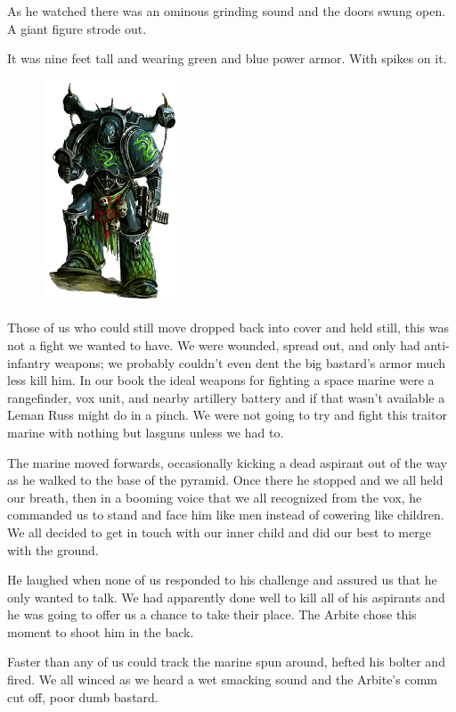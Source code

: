 As he watched there was an ominous grinding sound and the doors swung open. 
A giant figure strode out. 

It was nine feet tall and wearing green and blue power armor. 
With spikes on it.

\begin{figure}
	\begin{center}
		\includegraphics[width=\figwidth]{pics/6/46.png}
	\end{center}
\end{figure}
Those of us who could still move dropped back into cover and held still, this was not a fight we wanted to have. 
We were wounded, spread out, and only had anti-infantry weapons; we probably couldn't even dent the big bastard's armor much less kill him. 
In our book the ideal weapons for fighting a space marine were a rangefinder, vox unit, and nearby artillery battery and if that wasn't available a Leman Russ might do in a pinch. 
We were not going to try and fight this traitor marine with nothing but lasguns unless we had to.

The marine moved forwards, occasionally kicking a dead aspirant out of the way as he walked to the base of the pyramid. 
Once there he stopped and we all held our breath, then in a booming voice that we all recognized from the vox, he commanded us to stand and face him like men instead of cowering like children. 
We all decided to get in touch with our inner child and did our best to merge with the ground. 

He laughed when none of us responded to his challenge and assured us that he only wanted to talk. 
We had apparently done well to kill all of his aspirants and he was going to offer us a chance to take their place. 
The Arbite chose this moment to shoot him in the back.

Faster than any of us could track the marine spun around, hefted his bolter and fired. 
We all winced as we heard a wet smacking sound and the Arbite's comm cut off, poor dumb bastard.

